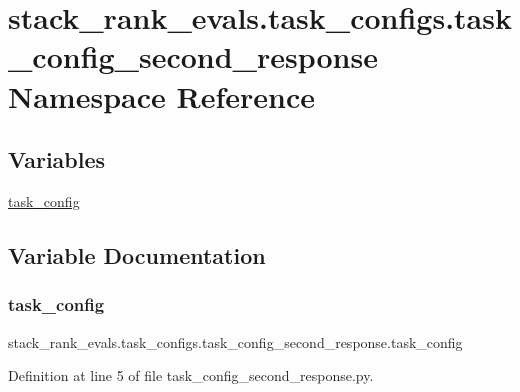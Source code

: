 \hypertarget{namespacestack__rank__evals_1_1task__configs_1_1task__config__second__response}{}\section{stack\+\_\+rank\+\_\+evals.\+task\+\_\+configs.\+task\+\_\+config\+\_\+second\+\_\+response Namespace Reference}
\label{namespacestack__rank__evals_1_1task__configs_1_1task__config__second__response}
\subsection*{Variables}
\begin{DoxyCompactItemize}
\item 
\hyperlink{namespacestack__rank__evals_1_1task__configs_1_1task__config__second__response_a1a1af9d6bbc0fb52d4addc23e6ea9a62}{task\+\_\+config}
\end{DoxyCompactItemize}


\subsection{Variable Documentation}
\mbox{\label{namespacestack__rank__evals_1_1task__configs_1_1task__config__second__response_a1a1af9d6bbc0fb52d4addc23e6ea9a62}} 
\subsubsection{\texorpdfstring{task\+\_\+config}{task\_config}}
{\footnotesize\ttfamily stack\+\_\+rank\+\_\+evals.\+task\+\_\+configs.\+task\+\_\+config\+\_\+second\+\_\+response.\+task\+\_\+config}



Definition at line 5 of file task\+\_\+config\+\_\+second\+\_\+response.\+py.

